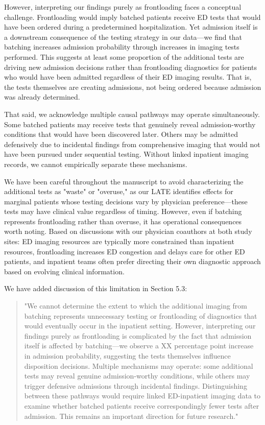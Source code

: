 \documentclass[11pt]{article}
\newcommand{\1}{\hbox{\rm 1\kern-.35em 1}}
\begin{document}
{However, interpreting our findings purely as frontloading faces a conceptual challenge. Frontloading would imply batched patients receive ED tests that would have been ordered during a predetermined hospitalization. Yet admission itself is a downstream consequence of the testing strategy in our data—we find that batching increases admission probability through increases in imaging tests performed. This suggests at least some proportion of the additional tests are driving new admission decisions rather than frontloading diagnostics for patients who would have been admitted regardless of their ED imaging results. That is, the tests themselves are creating admissions, not being ordered because admission was already determined.

That said, we acknowledge multiple causal pathways may operate simultaneously. Some batched patients may receive tests that genuinely reveal admission-worthy conditions that would have been discovered later. Others may be admitted defensively due to incidental findings from comprehensive imaging that would not have been pursued under sequential testing. Without linked inpatient imaging records, we cannot empirically separate these mechanisms.

We have been careful throughout the manuscript to avoid characterizing the additional tests as "waste" or "overuse," as our LATE identifies effects for marginal patients whose testing decisions vary by physician preference—these tests may have clinical value regardless of timing. However, even if batching represents frontloading rather than overuse, it has operational consequences worth noting. Based on discussions with our physician coauthors at both study sites: ED imaging resources are typically more constrained than inpatient resources, frontloading increases ED congestion and delays care for other ED patients, and inpatient teams often prefer directing their own diagnostic approach based on evolving clinical information.

We have added discussion of this limitation in Section 5.3:

\begin{quote}
"We cannot determine the extent to which the additional imaging from batching represents unnecessary testing or frontloading of diagnostics that would eventually occur in the inpatient setting. However, interpreting our findings purely as frontloading is complicated by the fact that admission itself is affected by batching—we observe a XX percentage point increase in admission probability, suggesting the tests themselves influence disposition decisions. Multiple mechanisms may operate: some additional tests may reveal genuine admission-worthy conditions, while others may trigger defensive admissions through incidental findings. Distinguishing between these pathways would require linked ED-inpatient imaging data to examine whether batched patients receive correspondingly fewer tests after admission. This remains an important direction for future research."
\end{quote}

}
\end{document}
